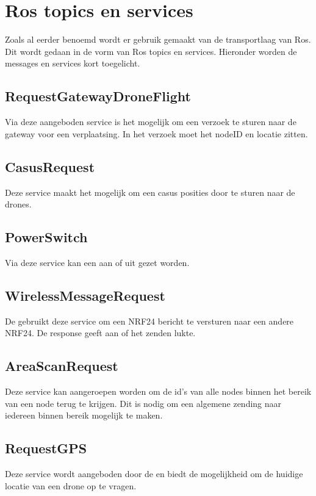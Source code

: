 \documentclass[a4paper, 11pt, oneside]{report}
\begin{document}
\section{Ros topics en services}
\label{architectural:ros}
Zoals al eerder benoemd wordt er gebruik gemaakt van de transportlaag van Ros. Dit wordt gedaan in de vorm van Ros topics en services. Hieronder worden de messages en services kort toegelicht.
\subsection{RequestGatewayDroneFlight}
\label{architectural:ros:service:RequestGatewayDroneFlight}
Via deze aangeboden service is het mogelijk om een verzoek te sturen naar de gateway voor een verplaatsing. In het verzoek moet het nodeID en locatie zitten.


\subsection{CasusRequest}
\label{architectural:ros:service:CasusRequest}
Deze service maakt het mogelijk om een casus posities door te sturen naar de drones.

\subsection{PowerSwitch}
\label{architectural:ros:service:PowerSwitch}
Via deze service kan een  aan of uit gezet worden.

\subsection{WirelessMessageRequest}
\label{architectural:ros:service:WirelessMessageRequest}
De  gebruikt deze service om een NRF24 bericht te versturen naar een andere NRF24. De response geeft aan of het zenden lukte.

\subsection{AreaScanRequest}
\label{architectural:ros:service:AreaScanRequest}
Deze service kan aangeroepen worden om de id's van alle nodes binnen het bereik van een node terug te krijgen. 
Dit is nodig om een algemene zending naar iedereen binnen bereik mogelijk te maken.

\subsection{RequestGPS}
\label{architectural:ros:service:RequestGPS}
Deze service wordt aangeboden door de  en biedt de mogelijkheid om de huidige locatie van een drone op te vragen. 
\end{document}
